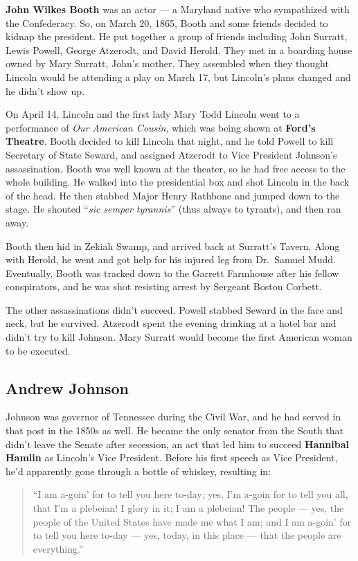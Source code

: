 \textbf{John Wilkes Booth} was an actor --- a Maryland native who sympathized with the Confederacy.
So, on March 20, 1865, Booth and some friends decided to kidnap the president.
He put together a group of friends including John Surratt, Lewis Powell, George Atzerodt, and David Herold.
They met in a boarding house owned by Mary Surratt, John's mother.
They assembled when they thought Lincoln would be attending a play on March 17,
but Lincoln's plans changed and he didn't show up.

On April 14, Lincoln and the first lady Mary Todd Lincoln went to a performance of \textit{Our American Cousin},
which was being shown at \textbf{Ford's Theatre}.
Booth decided to kill Lincoln that night, and he told Powell to kill Secretary of State Seward,
and assigned Atzerodt to Vice President Johnson's assassination.
Booth was well known at the theater, so he had free access to the whole building.
He walked into the presidential box and shot Lincoln in the back of the head.
He then stabbed Major Henry Rathbone and jumped down to the stage.
He shouted ``\textit{sic semper tyrannis}'' (thus always to tyrants), and then ran away.

Booth then hid in Zekiah Swamp, and arrived back at Surratt's Tavern.
Along with Herold, he went and got help for his injured leg from Dr.\ Samuel Mudd.
Eventually, Booth was tracked down to the Garrett Farmhouse after his fellow conspirators,
and he was shot resisting arrest by Sergeant Boston Corbett.

The other assassinations didn't succeed.
Powell stabbed Seward in the face and neck, but he survived.
Atzerodt spent the evening drinking at a hotel bar and didn't try to kill Johnson.
Mary Surratt would become the first American woman to be executed.

\subsection*{Andrew Johnson}

Johnson was governor of Tennessee during the Civil War, and he had served in that post in the 1850s as well.
He became the only senator from the South that didn't leave the Senate after secession,
an act that led him to succeed \textbf{Hannibal Hamlin} as Lincoln's Vice President.
Before his first speech as Vice President, he'd apparently gone through a bottle of whiskey, resulting in:

\begin{quotation}
  ``I am a-goin' for to tell you here to-day;
  yes, I'm a-goin for to tell you all, that I'm a plebeian!
  I glory in it; I am a plebeian!
  The people --- yes, the people of the United States have made me what I am;
  and I am a-goin' for to tell you here to-day --- yes, today, in this place --- that the people are everything.''
\end{quotation}

